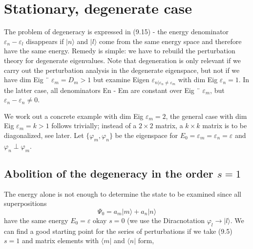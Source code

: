 \section{Stationary, degenerate case}
The problem of degeneracy is expressed in (9.15) - the energy denominator $\varepsilon_n-\varepsilon_l$ disappears if $| n\rangle$ and $| l\rangle$ come from the same energy space and therefore have the same energy. Remedy is simple: we have to rebuild the perturbation theory for degenerate eigenvalues. Note that degeneration is only relevant if we carry out the perturbation analysis in the degenerate eigenspace, but not if we have dim Eig ¨ $\varepsilon_m = D_m> 1$ but examine Eigen $\varepsilon_{n|\varepsilon_n\neq\varepsilon_m}$ with dim Eig $\varepsilon_n = 1$. In the latter case, all denominators En - Em are constant over Eig ¨ $\varepsilon_m$, but $\varepsilon_n-\varepsilon_n\neq 0$.

We work out a concrete example with dim Eig $\varepsilon_m = 2$, the general case with dim Eig $\varepsilon_m = k> 1$ follows trivially; instead of a $2 \times 2$ matrix, a $k \times k$ matrix is ​​to be diagonalized, see later. Let $\{\varphi_m,\varphi_n\}$ be the eigenspace for $E_0=\varepsilon_m=\varepsilon_n=\varepsilon$ and $\varphi_n\perp\varphi_m$.

\subsection{Abolition of the degeneracy in the order $s = 1$}
The energy alone is not enough to determine the state to be examined since all superpositions
\begin{equation}
    \Psi_0 = a_m|m\rangle+a_n|n\rangle
\end{equation}
have the same energy $E_0 = \varepsilon$ okay $s = 0$ (we use the Diracnotation $\varphi_l\rightarrow|l\rangle$. We can find a good starting point for the series of perturbations if we take (9.5) $s = 1$ and matrix elements with $\langle m|$ and $\langle n|$ form,

